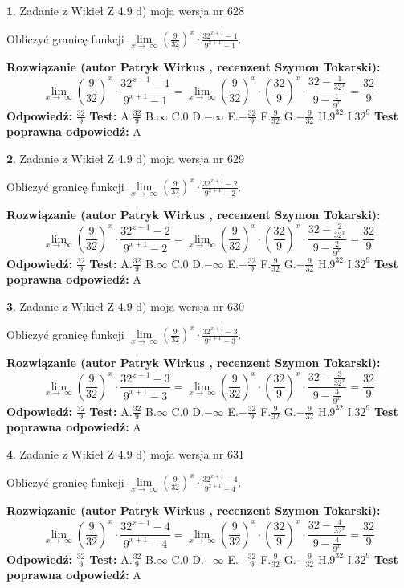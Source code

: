 \documentclass[12pt, a4paper]{article}
\theoremstyle{definition} %
\newtheorem{zad}{}
\newcommand{\zadStart}[1]{\begin{zad}#1\newline}
\newcommand{\zadStop}{\end{zad}}
\newcommand{\rozwStart}[2]{\noindent \textbf{Rozwiązanie (autor #1 , recenzent #2): }\newline}
\newcommand{\rozwStop}{\newline}
\newcommand{\odpStart}{\noindent \textbf{Odpowiedź:}\newline}
\newcommand{\odpStop}{\newline}
\newcommand{\testStart}{\noindent \textbf{Test:}\newline}
\newcommand{\testStop}{\newline}
\newcommand{\kluczStart}{\noindent \textbf{Test poprawna odpowiedź:}\newline}
\newcommand{\kluczStop}{\newline}
\begin{document}
\zadStart{Zadanie z Wikieł Z 4.9 d) moja wersja nr 628}


Obliczyć granicę funkcji  $\lim\limits_{x\to\ \infty}(\frac{9}{32})^{x}\cdot\frac{32^{x+1}-1}{9^{x+1}-1}$.
\zadStop
\rozwStart{Patryk Wirkus}{Szymon Tokarski}
$$\lim\limits_{x\to\ \infty}(\frac{9}{32})^{x}\cdot\frac{32^{x+1}-1}{9^{x+1}-1}=\lim\limits_{x\to\ \infty}(\frac{9}{32})^{x}\cdot(\frac{32}{9})^{x} \cdot \frac{32-\frac{1}{32^{x}}}{9-\frac{1}{9^{x}}} = \frac{32}{9}$$
\rozwStop
\odpStart
$\frac{32}{9}$
\odpStop
\testStart
A.$\frac{32}{9}$ B.$\infty$ C.$0$ D.$-\infty$ E.$-\frac{32}{9}$
F.$\frac{9}{32}$ G.$-\frac{9}{32}$
H.$9^{32}$
I.$32^{9}$
\testStop
\kluczStart
A
\kluczStop



\zadStart{Zadanie z Wikieł Z 4.9 d) moja wersja nr 629}


Obliczyć granicę funkcji  $\lim\limits_{x\to\ \infty}(\frac{9}{32})^{x}\cdot\frac{32^{x+1}-2}{9^{x+1}-2}$.
\zadStop
\rozwStart{Patryk Wirkus}{Szymon Tokarski}
$$\lim\limits_{x\to\ \infty}(\frac{9}{32})^{x}\cdot\frac{32^{x+1}-2}{9^{x+1}-2}=\lim\limits_{x\to\ \infty}(\frac{9}{32})^{x}\cdot(\frac{32}{9})^{x} \cdot \frac{32-\frac{2}{32^{x}}}{9-\frac{2}{9^{x}}} = \frac{32}{9}$$
\rozwStop
\odpStart
$\frac{32}{9}$
\odpStop
\testStart
A.$\frac{32}{9}$ B.$\infty$ C.$0$ D.$-\infty$ E.$-\frac{32}{9}$
F.$\frac{9}{32}$ G.$-\frac{9}{32}$
H.$9^{32}$
I.$32^{9}$
\testStop
\kluczStart
A
\kluczStop



\zadStart{Zadanie z Wikieł Z 4.9 d) moja wersja nr 630}


Obliczyć granicę funkcji  $\lim\limits_{x\to\ \infty}(\frac{9}{32})^{x}\cdot\frac{32^{x+1}-3}{9^{x+1}-3}$.
\zadStop
\rozwStart{Patryk Wirkus}{Szymon Tokarski}
$$\lim\limits_{x\to\ \infty}(\frac{9}{32})^{x}\cdot\frac{32^{x+1}-3}{9^{x+1}-3}=\lim\limits_{x\to\ \infty}(\frac{9}{32})^{x}\cdot(\frac{32}{9})^{x} \cdot \frac{32-\frac{3}{32^{x}}}{9-\frac{3}{9^{x}}} = \frac{32}{9}$$
\rozwStop
\odpStart
$\frac{32}{9}$
\odpStop
\testStart
A.$\frac{32}{9}$ B.$\infty$ C.$0$ D.$-\infty$ E.$-\frac{32}{9}$
F.$\frac{9}{32}$ G.$-\frac{9}{32}$
H.$9^{32}$
I.$32^{9}$
\testStop
\kluczStart
A
\kluczStop



\zadStart{Zadanie z Wikieł Z 4.9 d) moja wersja nr 631}


Obliczyć granicę funkcji  $\lim\limits_{x\to\ \infty}(\frac{9}{32})^{x}\cdot\frac{32^{x+1}-4}{9^{x+1}-4}$.
\zadStop
\rozwStart{Patryk Wirkus}{Szymon Tokarski}
$$\lim\limits_{x\to\ \infty}(\frac{9}{32})^{x}\cdot\frac{32^{x+1}-4}{9^{x+1}-4}=\lim\limits_{x\to\ \infty}(\frac{9}{32})^{x}\cdot(\frac{32}{9})^{x} \cdot \frac{32-\frac{4}{32^{x}}}{9-\frac{4}{9^{x}}} = \frac{32}{9}$$
\rozwStop
\odpStart
$\frac{32}{9}$
\odpStop
\testStart
A.$\frac{32}{9}$ B.$\infty$ C.$0$ D.$-\infty$ E.$-\frac{32}{9}$
F.$\frac{9}{32}$ G.$-\frac{9}{32}$
H.$9^{32}$
I.$32^{9}$
\testStop
\kluczStart
A
\kluczStop
\end{document}
